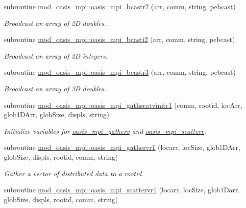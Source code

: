 \begin{DoxyCompactItemize}
subroutine \hyperlink{namespacemod__oasis__mpi_ab14018fe59cd737067e4f4202a3eeb39}{mod\+\_\+oasis\+\_\+mpi\+::oasis\+\_\+mpi\+\_\+bcastr2} (arr, comm, string, pebcast)
\begin{DoxyCompactList}\small\item\em Broadcast an array of 2D doubles. \end{DoxyCompactList}\item 
subroutine \hyperlink{namespacemod__oasis__mpi_ad6918adccdd62a278066f41b0b8edf57}{mod\+\_\+oasis\+\_\+mpi\+::oasis\+\_\+mpi\+\_\+bcasti2} (arr, comm, string, pebcast)
\begin{DoxyCompactList}\small\item\em Broadcast an array of 2D integers. \end{DoxyCompactList}\item 
subroutine \hyperlink{namespacemod__oasis__mpi_ac01edbda3e33b1feff9b797f83f82e8c}{mod\+\_\+oasis\+\_\+mpi\+::oasis\+\_\+mpi\+\_\+bcastr3} (arr, comm, string, pebcast)
\begin{DoxyCompactList}\small\item\em Broadcast an array of 3D doubles. \end{DoxyCompactList}\item 
subroutine \hyperlink{namespacemod__oasis__mpi_a68afb4ab4136545faeaa2c37a1eb294a}{mod\+\_\+oasis\+\_\+mpi\+::oasis\+\_\+mpi\+\_\+gathscatvinitr1} (comm, rootid, loc\+Arr, glob1\+D\+Arr, glob\+Size, displs, string)
\begin{DoxyCompactList}\small\item\em Initialize variables for \hyperlink{interfacemod__oasis__mpi_1_1oasis__mpi__gatherv}{oasis\+\_\+mpi\+\_\+gatherv} and \hyperlink{interfacemod__oasis__mpi_1_1oasis__mpi__scatterv}{oasis\+\_\+mpi\+\_\+scatterv}. \end{DoxyCompactList}\item 
subroutine \hyperlink{namespacemod__oasis__mpi_a88a13ea3b4f96074669fdc872fe41728}{mod\+\_\+oasis\+\_\+mpi\+::oasis\+\_\+mpi\+\_\+gathervr1} (locarr, loc\+Size, glob1\+D\+Arr, glob\+Size, displs, rootid, comm, string)
\begin{DoxyCompactList}\small\item\em Gather a vector of distributed data to a rootid. \end{DoxyCompactList}\item 
subroutine \hyperlink{namespacemod__oasis__mpi_a9d0d807b92d39c9789eea4744d331612}{mod\+\_\+oasis\+\_\+mpi\+::oasis\+\_\+mpi\+\_\+scattervr1} (locarr, loc\+Size, glob1\+Darr, glob\+Size, displs, rootid, comm, string)

\end{DoxyCompactItemize}
